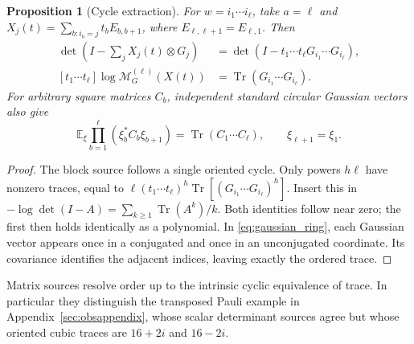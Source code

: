 \documentclass[11pt,a4paper]{amsart}
\numberwithin{equation}{section}
\newtheorem{proposition}[theorem]{Proposition}
\theoremstyle{definition}
\theoremstyle{remark}
\newcommand{\E}{\mathbb E}
\DeclareMathOperator{\Tr}{Tr}
\begin{document}
\begin{proposition}[Cycle extraction]\label{prop:matrix_word_source}
For $w=i_1\cdots i_\ell$, take $a=\ell$ and
$X_j(t)=\sum_{b:i_b=j}t_bE_{b,b+1}$, where $E_{\ell,\ell+1}=E_{\ell,1}$. Then
\begin{align}
 \det\left(I-\sum_jX_j(t)\otimes G_j\right)
 &=\det(I-t_1\cdots t_\ell G_{i_1}\cdots G_{i_\ell}),\label{eq:cycle_determinant}\\
 [t_1\cdots t_\ell]\log\mathcal M_G^{(\ell)}(X(t))
 &=\Tr(G_{i_1}\cdots G_{i_\ell}).\label{eq:cycle_extract}
\end{align}
For arbitrary square matrices $C_b$, independent standard circular Gaussian vectors also give
\begin{equation}\label{eq:gaussian_ring}
 \E_\xi\prod_{b=1}^{\ell}(\xi_b^*C_b\xi_{b+1})
 =\Tr(C_1\cdots C_\ell),\qquad \xi_{\ell+1}=\xi_1.
\end{equation}
\end{proposition}
\begin{proof}
The block source follows a single oriented cycle. Only powers $h\ell$ have nonzero traces, equal to
$\ell(t_1\cdots t_\ell)^h\Tr[(G_{i_1}\cdots G_{i_\ell})^h]$.
Insert this in $-\log\det(I-A)=\sum_{k\ge1}\Tr(A^k)/k$. Both identities follow near zero; the first then holds identically as a polynomial. In \eqref{eq:gaussian_ring}, each Gaussian vector appears once in a conjugated and once in an unconjugated coordinate. Its covariance identifies the adjacent indices, leaving exactly the ordered trace.
\end{proof}
Matrix sources resolve order up to the intrinsic cyclic equivalence of trace. In particular they distinguish the transposed Pauli example in Appendix~\ref{sec:obsappendix}, whose scalar determinant sources agree but whose oriented cubic traces are $16+2i$ and $16-2i$.
\end{document}
